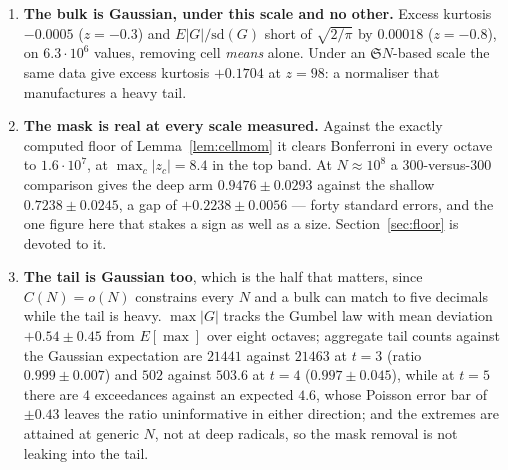 \documentclass[11pt,a4paper]{article}
\theoremstyle{plain}
\theoremstyle{definition}
\renewcommand{\SS}{\mathfrak{S}}
\begin{document}
\begin{enumerate}
\item \textbf{The bulk is Gaussian, under this scale and no other.}
  Excess kurtosis $-0.0005$ ($z=-0.3$) and
  $E|G|/\mathrm{sd}(G)$ short of $\sqrt{2/\pi}$ by $0.00018$
  ($z=-0.8$), on $6.3\cdot10^6$ values, removing cell \emph{means}
  alone. Under an $\SS N$-based scale the same data give excess
  kurtosis $+0.1704$ at $z=98$: a normaliser that manufactures a heavy
  tail.

\item \textbf{The mask is real at every scale measured.} Against the
  exactly computed floor of Lemma~\ref{lem:cellmom} it clears
  Bonferroni in every octave to $1.6\cdot10^7$, at $\max_c|z_c| = 8.4$
  in the top band. At $N\approx10^8$ a $300$-versus-$300$ comparison
  gives the deep arm $0.9476\pm0.0293$ against the shallow
  $0.7238\pm0.0245$, a gap of $+0.2238\pm0.0056$ --- forty standard
  errors, and the one figure here that stakes a sign as well as a size.
  Section~\ref{sec:floor} is devoted to it.

\item \textbf{The tail is Gaussian too}, which is the half that
  matters, since $C(N)=o(N)$ constrains every $N$ and a bulk can match
  to five decimals while the tail is heavy. $\max|G|$ tracks the Gumbel
  law with mean deviation $+0.54\pm0.45$ from $E[\max]$ over eight
  octaves; aggregate tail counts against the Gaussian expectation are
  $21441$ against $21463$ at $t=3$ (ratio $0.999\pm0.007$) and $502$
  against $503.6$ at $t=4$ ($0.997\pm0.045$), while at $t=5$ there are
  $4$ exceedances against an expected $4.6$, whose Poisson error bar of
  $\pm0.43$ leaves the ratio uninformative in either direction; and the
  extremes are attained at generic $N$, not at deep radicals, so the
  mask removal is not leaking into the tail.


\end{enumerate}
\end{document}
